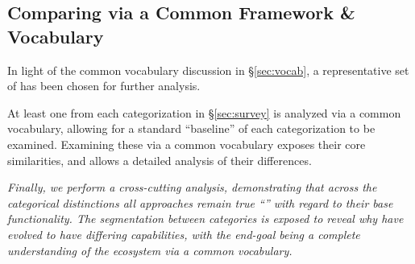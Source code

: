 \documentclass{sig-alternate}
\begin{document}
\subsection{Comparing \pilotjobs via a Common Framework \& Vocabulary}
In light of the common vocabulary discussion in 
\S\ref{sec:vocab}, a representative set of \pilotjobs
has been chosen for further analysis.  

At least one \pilotjob from each categorization in
\S\ref{sec:survey} is analyzed via a common
vocabulary, allowing for a standard
``baseline'' of each \pilotjob categorization to be
examined.  Examining these \pilotjobs via a
common vocabulary exposes their core similarities, and allows a
detailed analysis of their differences.


\textit{Finally, we perform
a cross-cutting analysis, demonstrating that across the categorical
distinctions all approaches remain true ``\pilotjobs'' with regard
to their base functionality.  The segmentation between categories
is exposed to reveal why \pilotjobs have evolved to have
differing capabilities, with the end-goal being a
complete understanding of the \pilotjob ecosystem via a common
vocabulary.}
\end{document}
